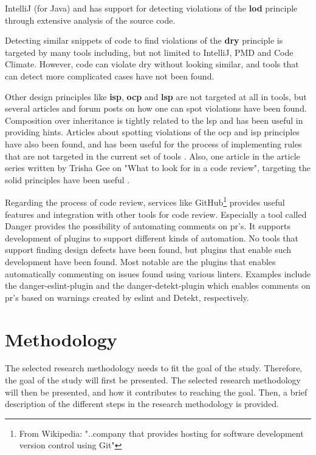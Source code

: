 \documentclass[pdftex,10pt,b5paper,twoside]{report}
\begin{document}
IntelliJ \cite{IntelliJ} (for Java) and \cite{pmd} has support for detecting violations of the \textbf{\gls{lod}} principle through extensive analysis of the source code.

Detecting similar snippets of code to find violations of the \textbf{\gls{dry}} principle is targeted by many tools including, but not limited to IntelliJ\cite{IntelliJ}, PMD\cite{pmd} and Code Climate\cite{codeclimate}. However, code can violate \gls{dry} without looking similar, and tools that can detect more complicated cases have not been found.  

Other design principles like \textbf{\gls{isp}}, \textbf{\gls{ocp}} and \textbf{\gls{lsp}} are not targeted at all in tools, but several articles and forum posts on how one can spot violations have been found. Composition over inheritance is tightly related to the \gls{lsp} and \cite{composition-over-inheritance-stackoverflow} has been useful in providing hints. Articles about spotting violations of the \gls{ocp} and \gls{isp} principles have also been found, and has been useful for the process of implementing rules that are not targeted in the current set of tools \cite{ocp-violations} \cite{ocp2} \cite{isp-violation} \cite{ocp3}. Also, one article in the article series written by Trisha Gee on "What to look for in a code review", targeting the \gls{solid} principles have been useful \cite{whattolookforincodereview}.  

Regarding the process of code review, services like GitHub\cite{github}\footnote{From Wikipedia: "..company that provides hosting for software development version control using Git"\cite{github-wiki}} provides useful features and integration with other tools for code review. Especially a tool called Danger\cite{danger} provides the possibility of automating comments on \gls{pr}'s. It supports development of plugins to support different kinds of automation. No tools that support finding design defects have been found, but plugins that enable such development have been found. Most notable are the plugins that enables automatically commenting on issues found using various linters. Examples include the danger-eslint-plugin\cite{danger-eslint-plugin} and the danger-detekt-plugin\cite{danger-detekt-plugin} which enables comments on \gls{pr}'s based on warnings created by eslint\cite{eslint} and Detekt\cite{detekt}, respectively. 
\cleardoublepage

\chapter{Methodology}
\label{methodology}
The selected research methodology needs to fit the goal of the study. Therefore, the goal of the study will first be presented. The selected research methodology will then be presented, and how it contributes to reaching the goal. Then, a brief description of the different steps in the research methodology is provided. 
\end{document}
